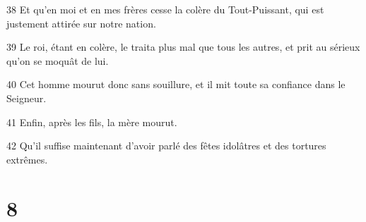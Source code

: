 \par 38 Et qu'en moi et en mes frères cesse la colère du Tout-Puissant, qui est justement attirée sur notre nation.
\par 39 Le roi, étant en colère, le traita plus mal que tous les autres, et prit au sérieux qu'on se moquât de lui.
\par 40 Cet homme mourut donc sans souillure, et il mit toute sa confiance dans le Seigneur.
\par 41 Enfin, après les fils, la mère mourut.
\par 42 Qu'il suffise maintenant d'avoir parlé des fêtes idolâtres et des tortures extrêmes.

\chapter{8}

